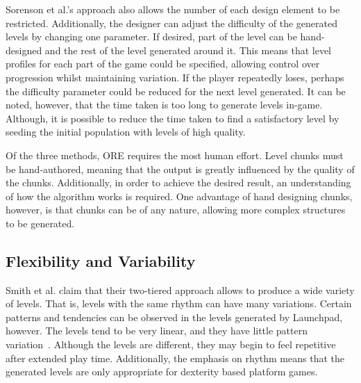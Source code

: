 \documentclass{scrartcl}
\begin{document}
Sorenson et al.'s approach also allows the number of each design element to be restricted. Additionally, the designer can adjust the difficulty of the generated levels by changing one parameter. If desired, part of the level can be hand-designed and the rest of the level generated around it. This means that level profiles for each part of the game could be specified, allowing control over progression whilst maintaining variation. If the player repeatedly loses, perhaps the difficulty parameter could be reduced for the next level generated. It can be noted, however, that the time taken is too long to generate levels in-game. Although, it is possible to reduce the time taken to find a satisfactory level by seeding the initial population with levels of high quality.


Of the three methods, ORE requires the most human effort. Level chunks must be hand-authored, meaning that the output is greatly influenced by the quality of the chunks. Additionally, in order to achieve the desired result, an understanding of how the algorithm works is required. One advantage of hand designing chunks, however, is that chunks can be of any nature, allowing more complex structures to be generated.


\subsection{Flexibility and Variability}

Smith et al. claim that their two-tiered approach allows to produce a wide variety of levels. That is, levels with the same rhythm can have many variations. Certain patterns and tendencies can be observed in the levels generated by Launchpad, however. The levels tend to be very linear, and they have little pattern variation~\cite{horn:comparative}. Although the levels are different, they may begin to feel repetitive after extended play time. Additionally, the emphasis on rhythm means that the generated levels are only appropriate for dexterity based platform games.
\end{document}

